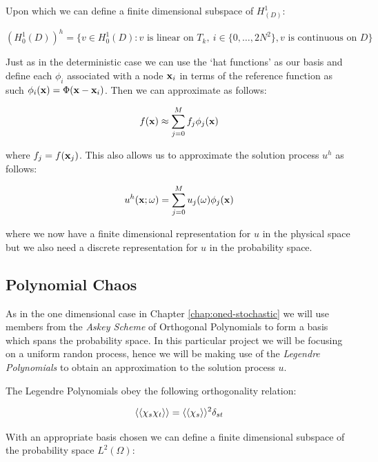Upon which we can define a finite dimensional subspace of $H^1_(D)$:

\begin{equation}
    (H^1_0(D))^h = \{v \in H^1_0(D): v \text{ is linear on } T_k,\ i \in \{0, \ldots, 2N^2\},
                      v \text{ is continuous on } D\}
\end{equation}

Just as in the deterministic case we can use the `hat functions' as our basis
and define each $\phi_i$ associated with a node $\mathbf{x}_i$ in terms of the
reference function  as such
$\phi_i(\mathbf{x}) = \Phi(\mathbf{x} - \mathbf{x}_i)$. Then we can approximate as follows:

\begin{equation}\label{eq:twod-stochastic-f-approx}
    f(\mathbf{x}) \approx \sum_{j=0}^Mf_j\phi_j(\mathbf{x})
\end{equation}

where $f_j = f(\mathbf{x}_j)$. This also allows us to approximate the solution
process $u^h$ as follows:

\begin{equation}
    u^h(\mathbf{x};\omega) = \sum_{j=0}^Mu_j(\omega)\phi_j(\mathbf{x})
\end{equation}

where we now have a finite dimensional representation for $u$ in the physical
space but we also need a discrete representation for $u$ in the probability
space.

\subsection{Polynomial Chaos}

As in the one dimensional case in Chapter \ref{chap:oned-stochastic} we will
use members from the \textit{Askey Scheme} of Orthogonal Polynomials to form a
basis which spans the probability space. In this particular project we will be
focusing on a uniform randon process, hence we will be making use of the
\textit{Legendre Polynomials} to obtain an approximation to the solution process
$u$.

The Legendre Polynomials obey the following orthogonality relation:

\begin{equation}
    \left\langle\langle\chi_s\chi_t\right\rangle\rangle = \left\langle\langle\chi_s\right\rangle\rangle^2\delta_{st}
\end{equation}

With an appropriate basis chosen we can define a finite dimensional subspace of
the probability space $L^2(\Omega)$:

